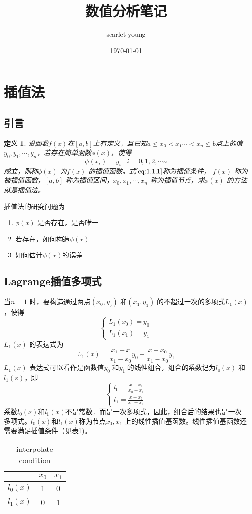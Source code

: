 \documentclass[a4paper]{article}
\title{数值分析笔记}
\author{scarlet young}
\date{\today}
\begin{document}
\section{插值法}
\subsection{引言}
\newtheorem{definition}{定义}
\begin{definition}
	设函数$f(x)$在$[a,b]$上有定义，且已知$a \le x_0 < x_1 \cdots <x_{n} \le b $点上的值$y_0,y_1,\cdots, y_{n} $，若存在简单函数$\phi(x)$，使得
\[
	\phi(x_{i}) = y_{i} \ \ \ \ i=0,1,2,\cdots n \tag{1.1.1} \label{eq:1.1.1} 
\]
	成立，则称$\phi(x)$ 为$f(x)$ 的插值函数。式$\ref{eq:1.1.1}$称为插值条件， $f(x)$ 称为被插值函数，$[a,b]$ 称为插值区间，$x_0,x_1,\cdots,x_{n}$ 称为插值节点，求$\phi(x)$ 的方法就是插值法。
\end{definition}

插值法的研究问题为
\begin{enumerate}
	\item $\phi(x)$ 是否存在，是否唯一
	\item 若存在，如何构造$\phi(x)$	
	\item 如何估计$\phi(x)$的误差
\end{enumerate}
\subsection{Lagrange插值多项式}
当$n=1$ 时，要构造通过两点$(x_0,y_0)$ 和$(x_1,y_1)$ 的不超过一次的多项式$L_1(x)$，使得
\[
	\begin{cases}
		L_1(x_0) = y_0 \\
		L_1(x_1) = y_1
	\end{cases}
\]
$L_1(x)$ 的表达式为
\[
L_1(x) = \frac{x_1-x}{x_1-x_0} y_0 + \frac{x - x_0}{x_1 - x_0}y_1
\] 
$L_1(x)$ 表达式可以看作是函数值$y_0$ 和$y_1$ 的线性组合，组合的系数记为$l_0(x)$ 和$l_1(x)$，即
\[
\begin{cases}
	l_0 = \frac{x - x_1}{x_0 - x_1} \\
	l_1 = \frac{x - x_0}{x_1 - x_0}
\end{cases}
\] 
系数$l_0(x)$和$l_1(x)$不是常数，而是一次多项式，因此，组合后的结果也是一次多项式。$l_0(x)$和$l_1(x)$称为节点$x_0,x_1$ 上的线性插值基函数。线性插值基函数还需要满足插值条件（见表\ref{tab:label})。
\begin{table}[htbp]
	\centering
	\caption{interpolate condition}
	\label{tab:label}
	\begin{tabular}{|c|c|c|}
		\hline
		& $x_0$ & $x_1$ \\
		\hline
		$l_0(x)$ & 1 & 0 \\
		\hline
		$l_1(x)$ & 0 & 1 \\
		\hline
	\end{tabular}
\end{table}
\end{document}
